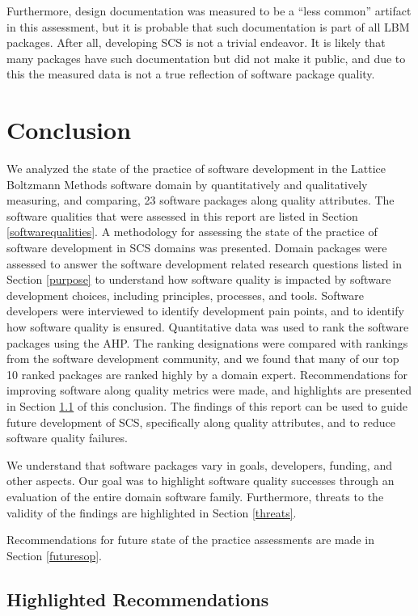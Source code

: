 \documentclass[12pt, notitlepage]{article}
\begin{document}
Furthermore, design documentation was measured to be a ``less common'' artifact in this assessment, but it is probable that such documentation is part of all LBM packages. After all, developing SCS is not a trivial endeavor. It is likely that many packages have such documentation but did not make it public, and due to this the measured data is not a true reflection of software package quality.

\newpage
\section{Conclusion}\label{conclusion}

We analyzed the state of the practice of software development in the Lattice Boltzmann Methods software domain by quantitatively and qualitatively measuring, and comparing, 23 software packages along quality attributes. The software qualities that were assessed in this report are listed in Section \ref{softwarequalities}. A methodology for assessing the state of the practice of software development in SCS domains was presented. Domain packages were assessed to answer the software development related research questions listed in Section \ref{purpose} to understand how software quality is impacted by software development choices, including principles, processes, and tools. Software developers were interviewed to identify development pain points, and to identify how software quality is ensured. Quantitative data was used to rank the software packages using the AHP. The ranking designations were compared with rankings from the software development community, and we found that many of our top 10 ranked packages are ranked highly by a domain expert. Recommendations for improving software along quality metrics were made, and highlights are presented in Section \ref{highlightedrecommendations} of this conclusion. The findings of this report can be used to guide future development of SCS, specifically along quality attributes, and to reduce software quality failures.

We understand that software packages vary in goals, developers, funding, and other aspects. Our goal was to highlight software quality successes through an evaluation of the entire domain software family. Furthermore, threats to the validity of the findings are highlighted in Section \ref{threats}. 

Recommendations for future state of the practice assessments are made in Section \ref{futuresop}.

\subsection{Highlighted Recommendations}\label{highlightedrecommendations}
\end{document}
